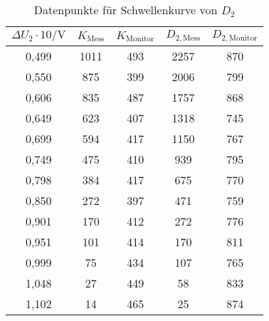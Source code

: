 \begin{table}[h]
    \centering
    \small
    \caption{Datenpunkte für Schwellenkurve von $D_2$}
    \label{tab:schwelle_d2}
    \begin{tabular}{c c c c c}
      \toprule
      $\Delta U_2 \cdot 10/\si{\volt}$ & $K_\mathrm{Mess}$ & $K_\mathrm{Monitor}$ & $D_{2,\mathrm{Mess}}$ & $D_{2,\mathrm{Monitor}}$ \\
      \midrule
      0,499      &     1011  &  493  &   2257  &  870\\
      0,550      &     875   &  399  &   2006  &  799\\
      0,606      &     835   &  487  &   1757  &  868\\
      0,649      &     623   &  407  &   1318  &  745\\
      0,699      &     594   &  417  &   1150  &  767\\
      0,749      &     475   &  410  &   939   &  795\\
      0,798      &     384   &  417  &   675   &  770\\
      0,850      &     272   &  397  &   471   &  759\\
      0,901      &     170   &  412  &   272   &  776\\
      0,951      &     101   &  414  &   170   &  811\\
      0,999      &     75    &  434  &   107   &  765\\
      1,048      &     27    &  449  &   58    &  833\\
      1,102      &     14    &  465  &   25    &  874\\
      \bottomrule
    \end{tabular}
  \end{table}
